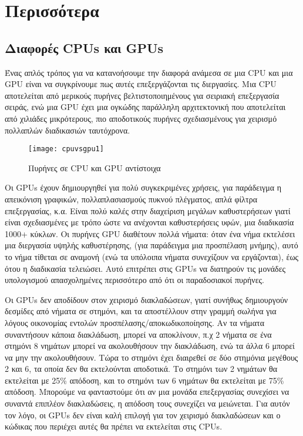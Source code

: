 \chapter{Περισσότερα}

\section{Διαφορές CPUs και GPUs}

Ένας απλός τρόπος για να κατανοήσουμε την διαφορά ανάμεσα σε μια CPU και μια GPU είναι να συγκρίνουμε πως αυτές επεξεργάζονται τις διεργασίες. Μια CPU αποτελείται από μερικούς πυρήνες βελτιστοποιημένους για σειριακή επεξεργασία σειράς, ενώ μια GPU έχει μια ογκώδης παράλληλη αρχιτεκτονική που αποτελείται από χιλιάδες μικρότερους, πιο αποδοτικούς πυρήνες σχεδιασμένους για χειρισμό πολλαπλών διαδικασιών ταυτόχρονα.

\begin{figure}[h]
\centering
\texttt{[image: cpuvsgpu1]}
\caption{Πυρήνες σε CPU και GPU αντίστοιχα}
\end{figure}

Οι GPUs έχουν δημιουργηθεί για πολύ συγκεκριμένες χρήσεις, για παράδειγμα η απεικόνιση γραφικών, πολλαπλασιασμούς πυκνού πλέγματος, απλά φίλτρα επεξεργασίας, κ.α. Είναι πολύ καλές στην διαχείριση μεγάλων καθυστερήσεων γιατί είναι σχεδιασμένες με τρόπο ώστε να ανέχονται καθυστερήσεις υφών, μια διαδικασία 1000+ κύκλων. Οι πυρήνες GPU διαθέτουν πολλά νήματα: όταν ένα νήμα εκτελέσει μια διεργασία υψηλής καθυστέρησης, (για παράδειγμα μια προσπέλαση μνήμης), αυτό το νήμα τίθεται σε αναμονή (ενώ τα υπόλοιπα νήματα συνεχίζουν να εργάζονται), έως ότου η διαδικασία τελειώσει. Αυτό επιτρέπει στις GPUs να διατηρούν τις μονάδες υπολογισμού απασχολημένες περισσότερο από ότι οι παραδοσιακοί πυρήνες.

Οι GPUs δεν αποδίδουν στον χειρισμό διακλαδώσεων, γιατί συνήθως δημιουργούν δεσμίδες από νήματα σε στημόνι, και τα αποστέλλουν στην γραμμή σωλήνα για λόγους οικονομίας εντολών προσπέλασης/αποκωδικοποίησης. Αν τα νήματα συναντήσουν κάποια διακλάδωση, μπορεί να αποκλίνουν, π.χ 2 νήματα σε ένα στημόνι 8 νημάτων μπορεί να ακολουθήσουν την διακλάδωση, ενώ τα άλλα 6 μπορεί να μην την ακολουθήσουν. Τώρα το στημόνι έχει διαιρεθεί σε δύο στημόνια μεγέθους 2 και 6, τα οποία δεν θα εκτελούνται αποδοτικά. Το στημόνι των 2 νημάτων θα εκτελείται με 25\% απόδοση, και το στημόνι των 6 νημάτων θα εκτελείται με 75\% απόδοση. Μπορούμε να φανταστούμε ότι αν μια μονάδα επεξεργασίας συνεχίσει να συναντά επιπλέον διακλαδώσεις, η απόδοση τους συνεχίζει να μειώνεται. Για αυτόν τον λόγο, οι GPUs δεν είναι καλή επιλογή για τον χειρισμό διακλαδώσεων και ο κώδικας που περιέχει αυτές θα πρέπει να εκτελείται στις CPUs.

